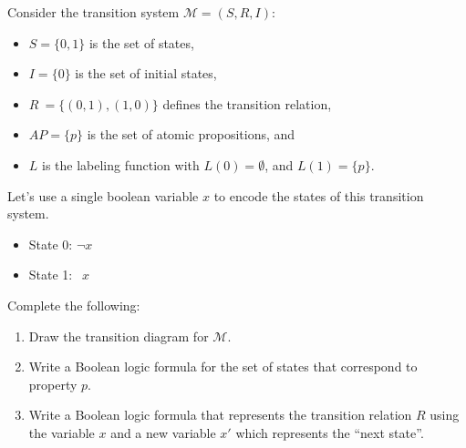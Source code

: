 \documentclass[12pt]{article}
\newenvironment{problem}[2][Problem]{\begin{trivlist}
\item[\hskip \labelsep {\bfseries #1}\hskip \labelsep {\bfseries #2.}]}{\end{trivlist}}
\begin{document}
\newpage

\begin{problem}{Symbolic Model Checking} Consider the transition system $\mathcal{M} = (S, R, I)$:

\begin{itemize} 

\item $S = \{0, 1\}$ is the set of states,

\item $I = \{0\}$ is the set of initial states,

\item $R \ = \{(0, 1), (1, 0)\}$
defines the transition relation, 

\item $AP = \{p\}$ is the set of atomic propositions, and 

\item $L$ is the labeling function with 
$L(0) = \emptyset$, and $L(1) = \{p\}$.


\end{itemize}

Let's use a single boolean variable $x$ to encode the states of this transition system.

\begin{multicols}{2}
\begin{itemize}

\item State 0: $\neg x $
\item State 1: $\ \ x$

\end{itemize}
\end{multicols}

Complete the following:

\begin{enumerate}[label=\roman*.]

\item  Draw the transition diagram for $\mathcal{M}$.

\vspace{3cm}

\item  Write a Boolean logic formula for the set of states that correspond to property $p$.

\vspace{1.5cm}

\item  Write a Boolean logic formula that represents the transition relation $R$ using the variable $x$ and a new variable $x'$ which represents the ``next state''.


\end{enumerate}
\end{problem}
\end{document}
